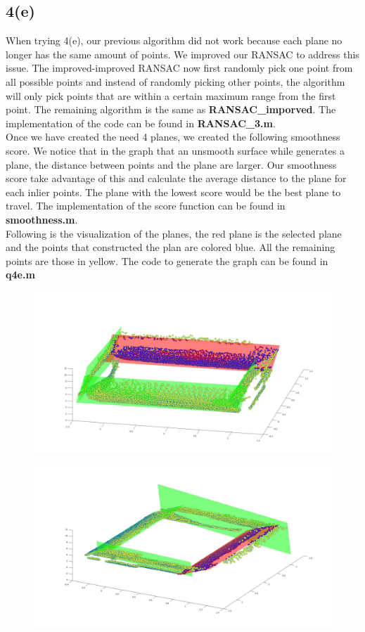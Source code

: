 \documentclass{article}
\begin{document}
\subsection*{4(e)}
When trying 4(e), our previous algorithm did not work because each plane no longer has the same amount of points. We improved our RANSAC to address this issue. The improved-improved RANSAC now first randomly pick one point from all possible points and instead of randomly picking other points, the algorithm will only pick points that are within a certain maximum range from the first point. The remaining algorithm is the same as \textbf{RANSAC\_imporved}. The implementation of the code can be found in \textbf{RANSAC\_3.m}.\\
Once we have created the need 4 planes, we created the following smoothness score. We notice that in the graph that an unsmooth surface while generates a plane, the distance between points and the plane are larger. Our smoothness score take advantage of this and calculate the average distance to the plane for each inlier points. The plane with the lowest score would be the best plane to travel. The implementation of the score function can be found in \textbf{smoothness.m}.\\
Following is the visualization of the planes, the red plane is the selected plane and the points that constructed the plan are colored blue. All the remaining points are those in yellow. The code to generate the graph can be found in \textbf{q4e.m}
\begin{figure}[H]
\centering
\includegraphics[width=5in]{figures/q4e.jpg}
\end{figure}
\begin{figure}[H]
\centering
\includegraphics[width=5in]{figures/q4e-alt.jpg}
\end{figure}
\end{document}
